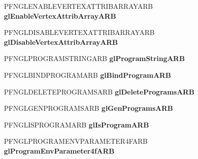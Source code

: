 \begin{DoxyCompactItemize}
\item 
\hypertarget{class_c_p_v_r_tgles_ext_a77c9fad1c247d8ca736f0a9befcd85d2}{P\+F\+N\+G\+L\+E\+N\+A\+B\+L\+E\+V\+E\+R\+T\+E\+X\+A\+T\+T\+R\+I\+B\+A\+R\+R\+A\+Y\+A\+R\+B {\bfseries gl\+Enable\+Vertex\+Attrib\+Array\+A\+R\+B}}\label{class_c_p_v_r_tgles_ext_a77c9fad1c247d8ca736f0a9befcd85d2}

\item 
\hypertarget{class_c_p_v_r_tgles_ext_accbb53e9666386cefccada0b06a9af2a}{P\+F\+N\+G\+L\+D\+I\+S\+A\+B\+L\+E\+V\+E\+R\+T\+E\+X\+A\+T\+T\+R\+I\+B\+A\+R\+R\+A\+Y\+A\+R\+B {\bfseries gl\+Disable\+Vertex\+Attrib\+Array\+A\+R\+B}}\label{class_c_p_v_r_tgles_ext_accbb53e9666386cefccada0b06a9af2a}

\item 
\hypertarget{class_c_p_v_r_tgles_ext_a3c7dbe84c874ce100c419b45b999eee7}{P\+F\+N\+G\+L\+P\+R\+O\+G\+R\+A\+M\+S\+T\+R\+I\+N\+G\+A\+R\+B {\bfseries gl\+Program\+String\+A\+R\+B}}\label{class_c_p_v_r_tgles_ext_a3c7dbe84c874ce100c419b45b999eee7}

\item 
\hypertarget{class_c_p_v_r_tgles_ext_a37aaa961cbcbb6367abe7519ce7fb008}{P\+F\+N\+G\+L\+B\+I\+N\+D\+P\+R\+O\+G\+R\+A\+M\+A\+R\+B {\bfseries gl\+Bind\+Program\+A\+R\+B}}\label{class_c_p_v_r_tgles_ext_a37aaa961cbcbb6367abe7519ce7fb008}

\item 
\hypertarget{class_c_p_v_r_tgles_ext_ae1b97ffa9b07aa2ef86e22b083748f8f}{P\+F\+N\+G\+L\+D\+E\+L\+E\+T\+E\+P\+R\+O\+G\+R\+A\+M\+S\+A\+R\+B {\bfseries gl\+Delete\+Programs\+A\+R\+B}}\label{class_c_p_v_r_tgles_ext_ae1b97ffa9b07aa2ef86e22b083748f8f}

\item 
\hypertarget{class_c_p_v_r_tgles_ext_a6d865fb18ea225d76f5d73fd294f1fe4}{P\+F\+N\+G\+L\+G\+E\+N\+P\+R\+O\+G\+R\+A\+M\+S\+A\+R\+B {\bfseries gl\+Gen\+Programs\+A\+R\+B}}\label{class_c_p_v_r_tgles_ext_a6d865fb18ea225d76f5d73fd294f1fe4}

\item 
\hypertarget{class_c_p_v_r_tgles_ext_a3e6d079b08a56f2fedbaa52a9fa47c77}{P\+F\+N\+G\+L\+I\+S\+P\+R\+O\+G\+R\+A\+M\+A\+R\+B {\bfseries gl\+Is\+Program\+A\+R\+B}}\label{class_c_p_v_r_tgles_ext_a3e6d079b08a56f2fedbaa52a9fa47c77}

\item 
\hypertarget{class_c_p_v_r_tgles_ext_a8ce25f4c77afbafc3ecd25a754e636f6}{P\+F\+N\+G\+L\+P\+R\+O\+G\+R\+A\+M\+E\+N\+V\+P\+A\+R\+A\+M\+E\+T\+E\+R4\+F\+A\+R\+B {\bfseries gl\+Program\+Env\+Parameter4f\+A\+R\+B}}\label{class_c_p_v_r_tgles_ext_a8ce25f4c77afbafc3ecd25a754e636f6}


\end{DoxyCompactItemize}

